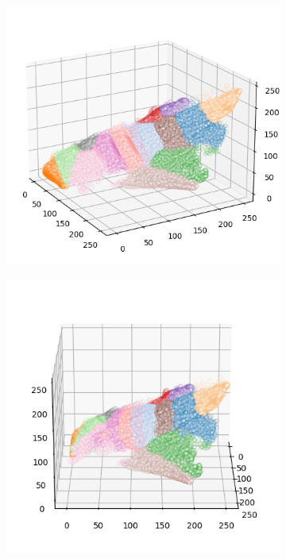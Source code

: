 \begin{figure}[htbp]
\begin{subfigure}[t]{0.32\textwidth}
    \end{subfigure}
    \begin{subfigure}[t]{0.32\textwidth}
        \includegraphics[width=\linewidth]{../../python_code/plots/kmeans/cat-10/clusters_elev20_azim-30.png}
    \end{subfigure}
    \begin{subfigure}[t]{0.32\textwidth}
        \includegraphics[width=\linewidth]{../../python_code/plots/kmeans/cat-10/clusters_elev20_azim0.png}

\end{subfigure}
\end{figure}
